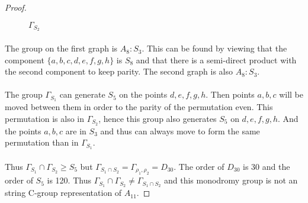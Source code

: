 \begin{proof}
\begin{figure}[H]
\begin{center}
      \caption{$\Gamma_{S_2}$}
    \end{center}
  \end{figure}

  \paragraph{}
  The group on the first graph is $A_8 : S_3$. This can be found by viewing that the component $\{a,b,c,d,e,f,g,h\}$ is $S_8$ and that there is a semi-direct product with the second component to keep parity. The second graph is also $A_8:S_3$.

  \paragraph{}
  The group $\Gamma_{S_1}$ can generate $S_5$ on the points $d,e,f,g,h$. Then points $a,b,c$ will be moved between them in order to the parity of the permutation even. This permutation is also in $\Gamma_{S_2}$, hence this group also generates $S_5$ on $d,e,f,g,h$. And the points $a,b,c$ are in $S_3$ and thus can always move to form the same permutation than in $\Gamma_{S_1}$.

  \paragraph{}
  Thus $\Gamma_{S_1} \cap \Gamma_{S_2} \ge S_5$ but $\Gamma_{S_1 \cap S_2} = \Gamma_{\rho_1, \rho_2} = D_{30}$. The order of $D_{30}$ is 30 and the order of $S_5$ is 120. Thus $\Gamma_{S_1} \cap \Gamma_{S_2} \neq \Gamma_{S_1 \cap S_2}$ and this monodromy group is not an string C-group representation of $A_{11}$.


\end{proof}
